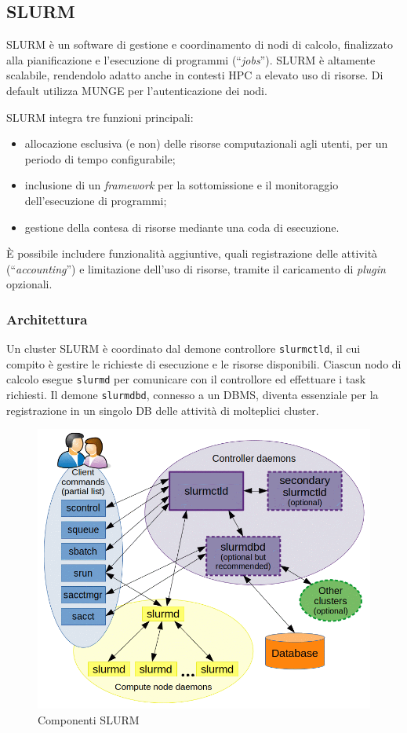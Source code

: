 \documentclass[12pt,a4paper,twoside,openright]{book}
\begin{document}
\subsection{SLURM}
\ac{SLURM} è un software di gestione e coordinamento di nodi di calcolo, finalizzato alla pianificazione e l'esecuzione di programmi (``\textit{jobs}''). \ac{SLURM} è altamente scalabile, rendendolo adatto anche in contesti \ac{HPC} a elevato uso di risorse. Di default utilizza \ac{MUNGE} per l'autenticazione dei nodi.

\ac{SLURM} integra tre funzioni principali:
\begin{itemize}
    \item allocazione esclusiva (e non) delle risorse computazionali agli utenti, per un periodo di tempo configurabile;
    \item inclusione di un \textit{framework} per la sottomissione e il monitoraggio dell'esecuzione di programmi;
    \item gestione della contesa di risorse mediante una coda di esecuzione.
\end{itemize}
È possibile includere funzionalità aggiuntive, quali registrazione delle attività (``\textit{accounting}'') e limitazione dell'uso di risorse, tramite il caricamento di \textit{plugin} opzionali.

\subsubsection{Architettura}
Un cluster \ac{SLURM} è coordinato dal demone controllore \texttt{slurmctld}, il cui compito è gestire le richieste di esecuzione e le risorse disponibili. Ciascun nodo di calcolo esegue \texttt{slurmd} per comunicare con il controllore ed effettuare i task richiesti. Il demone \texttt{slurmdbd}, connesso a un \ac{DBMS}, diventa essenziale per la registrazione in un singolo \ac{DB} delle attività di molteplici cluster.
\begin{figure}[ht]
    \centering
    \includegraphics[width=0.7\linewidth]{images/slurm_architecture.png}
    \caption{Componenti \ac{SLURM}}
    \label{fig:slurm-components}
\end{figure}
\end{document}
